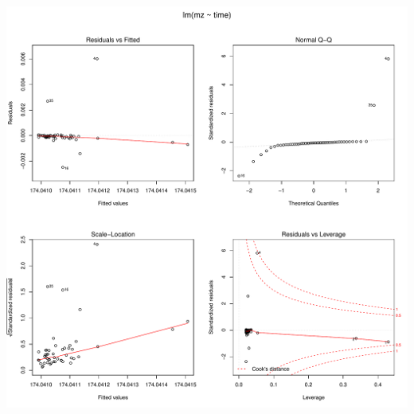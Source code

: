 \documentclass[]{article}
\begin{document}
\includegraphics{Supplementary_document_files/figure-latex/fit.lin.174-1.pdf}
\end{document}
